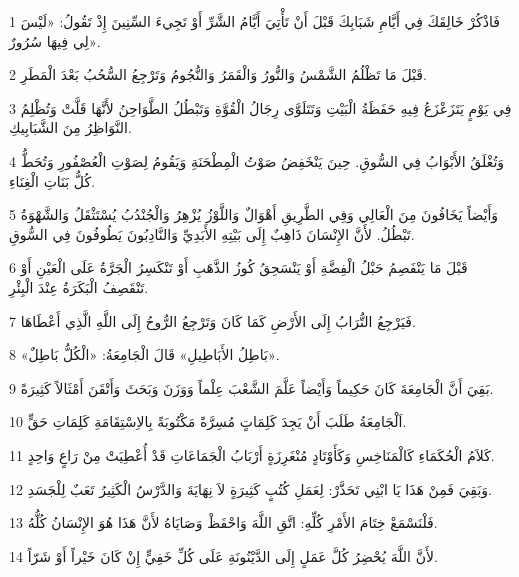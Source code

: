 \par 1 فَاذْكُرْ خَالِقَكَ فِي أَيَّامِ شَبَابِكَ قَبْلَ أَنْ تَأْتِيَ أَيَّامُ الشَّرِّ أَوْ تَجِيءَ السِّنِينَ إِذْ تَقُولُ: «لَيْسَ لِي فِيهَا سُرُورٌ».
\par 2 قَبْلَ مَا تَظْلُمُ الشَّمْسُ وَالنُّورُ وَالْقَمَرُ وَالنُّجُومُ وَتَرْجِعُ السُّحُبُ بَعْدَ الْمَطَرِ.
\par 3 فِي يَوْمٍ يَتَزَعْزَعُ فِيهِ حَفَظَةُ الْبَيْتِ وَتَتَلَوَّى رِجَالُ الْقُوَّةِ وَتَبْطُلُ الطَّوَاحِنُ لأَنَّهَا قَلَّتْ وَتُظْلِمُ النَّوَاظِرُ مِنَ الشَّبَابِيكِ.
\par 4 وَتُغْلَقُ الأَبْوَابُ فِي السُّوقِ. حِينَ يَنْخَفِضُ صَوْتُ الْمِطْحَنَةِ وَيَقُومُ لِصَوْتِ الْعُصْفُورِ وَتُحَطُّ كُلُّ بَنَاتِ الْغِنَاءِ.
\par 5 وَأَيْضاً يَخَافُونَ مِنَ الْعَالِي وَفِي الطَّرِيقِ أَهْوَالٌ وَاللَّوْزُ يُزْهِرُ وَالْجُنْدُبُ يُسْتَثْقَلُ وَالشَّهْوَةُ تَبْطُلُ. لأَنَّ الإِنْسَانَ ذَاهِبٌ إِلَى بَيْتِهِ الأَبَدِيِّ وَالنَّادِبُونَ يَطُوفُونَ فِي السُّوقِ.
\par 6 قَبْلَ مَا يَنْفَصِمُ حَبْلُ الْفِضَّةِ أَوْ يَنْسَحِقُ كُوزُ الذَّهَبِ أَوْ تَنْكَسِرُ الْجَرَّةُ عَلَى الْعَيْنِ أَوْ تَنْقَصِفُ الْبَكَرَةُ عِنْدَ الْبِئْرِ.
\par 7 فَيَرْجِعُ التُّرَابُ إِلَى الأَرْضِ كَمَا كَانَ وَتَرْجِعُ الرُّوحُ إِلَى اللَّهِ الَّذِي أَعْطَاهَا.
\par 8 «بَاطِلُ الأَبَاطِيلِ» قَالَ الْجَامِعَةُ: «الْكُلُّ بَاطِلٌ».
\par 9 بَقِيَ أَنَّ الْجَامِعَةَ كَانَ حَكِيماً وَأَيْضاً عَلَّمَ الشَّعْبَ عِلْماً وَوَزَنَ وَبَحَثَ وَأَتْقَنَ أَمْثَالاً كَثِيرَةً.
\par 10 اَلْجَامِعَةُ طَلَبَ أَنْ يَجِدَ كَلِمَاتٍ مُسِرَّةً مَكْتُوبَةً بِالاِسْتِقَامَةِ كَلِمَاتِ حَقٍّ.
\par 11 كَلاَمُ الْحُكَمَاءِ كَالْمَنَاخِسِ وَكَأَوْتَادٍ مُنْغَرِزَةٍ أَرْبَابُ الْجَمَاعَاتِ قَدْ أُعْطِيَتْ مِنْ رَاعٍ وَاحِدٍ.
\par 12 وَبَقِيَ فَمِنْ هَذَا يَا ابْنِي تَحَذَّرْ: لِعَمَلِ كُتُبٍ كَثِيرَةٍ لاَ نِهَايَةَ وَالدَّرْسُ الْكَثِيرُ تَعَبٌ لِلْجَسَدِ.
\par 13 فَلْنَسْمَعْ خِتَامَ الأَمْرِ كُلِّهِ: اتَّقِ اللَّهَ وَاحْفَظْ وَصَايَاهُ لأَنَّ هَذَا هُوَ الإِنْسَانُ كُلُّهُ.
\par 14 لأَنَّ اللَّهَ يُحْضِرُ كُلَّ عَمَلٍ إِلَى الدَّيْنُونَةِ عَلَى كُلِّ خَفِيٍّ إِنْ كَانَ خَيْراً أَوْ شَرّاً.


